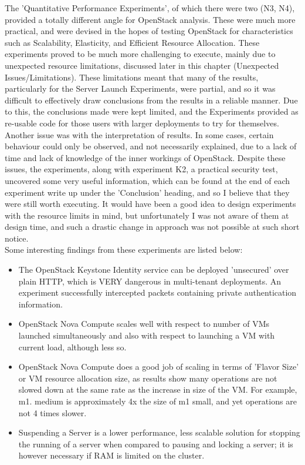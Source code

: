 The 'Quantitative Performance Experiments', of which there were two (N3, N4), provided a totally different angle for OpenStack analysis. These were much more practical, and were devised in the hopes of testing OpenStack for characteristics such as Scalability, Elasticity, and Efficient Resource Allocation. These experiments proved to be much more challenging to execute, mainly due to unexpected resource limitations, discussed later in this chapter (Unexpected Issues/Limitations). These limitations meant that many of the results, particularly for the Server Launch Experiments, were partial, and so it was difficult to effectively draw conclusions from the results in a reliable manner. Due to this, the conclusions made were kept limited, and the Experiments provided as re-usable code for those users with larger deployments to try for themselves. Another issue was with the interpretation of results. In some cases, certain behaviour could only be observed, and not necessarily explained, due to a lack of time and lack of knowledge of the inner workings of OpenStack. Despite these issues, the experiments, along with experiment K2, a practical security test, uncovered some very useful information, which can be found at the end of each experiment write up under the 'Conclusion' heading, and so I believe that they were still worth executing. It would have been a good idea to design experiments with the resource limits in mind, but unfortunately I was not aware of them at design time, and such a drastic change in approach was not possible at such short notice. \\
Some interesting findings from these experiments are listed below:
\begin{itemize}
\item The OpenStack Keystone Identity service can be deployed 'unsecured' over plain HTTP, which is VERY dangerous in multi-tenant deployments. An experiment successfully intercepted packets containing private authentication information.
\item OpenStack Nova Compute scales well with respect to number of VMs launched simultaneously and also with respect to launching a VM with current load, although less so.
\item OpenStack Nova Compute does a good job of scaling in terms of 'Flavor Size' or VM resource allocation size, as results show many operations are not slowed down at the same rate as the increase in size of the VM. For example, m1. medium is approximately 4x the size of m1 small, and yet operations are not 4 times slower. 
\item Suspending a Server is a lower performance, less scalable solution for stopping the running of a server when compared to pausing and locking a server; it is however necessary if RAM is limited on the cluster.  
\end{itemize}

